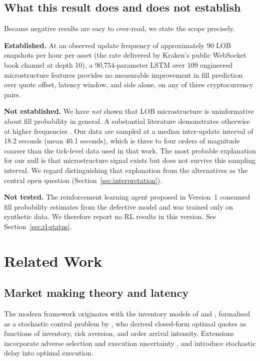 \documentclass[11pt]{article}
\begin{document}
\subsection{What this result does and does not establish}
\label{sec:scope}

Because negative results are easy to over-read, we state the scope precisely.

\textbf{Established.} At an observed update frequency of approximately 90 LOB
snapshots per hour per asset (the rate delivered by Kraken's public WebSocket
book channel at depth 10), a 90{,}754-parameter LSTM over 109
engineered microstructure features provides no measurable improvement in fill
prediction over quote offset, latency window, and side alone, on any of three
cryptocurrency pairs.

\textbf{Not established.} We have \emph{not} shown that LOB microstructure is
uninformative about fill probability in general. A substantial literature
demonstrates otherwise at higher frequencies
\citep{maglaras2022,arroyo2024}. Our data are sampled at a median inter-update
interval of 18.2 seconds (mean 40.1 seconds), which is three to four orders of
magnitude coarser than the tick-level data used in that work. The most probable
explanation for our null is that microstructure signal exists but does not
survive this sampling interval. We regard distinguishing that explanation from
the alternatives as the central open question
(Section~\ref{sec:interpretation}).

\textbf{Not tested.} The reinforcement learning agent proposed in Version~1
consumed fill probability estimates from the defective model and was trained
only on synthetic data. We therefore report no RL results in this version. See
Section~\ref{sec:rl-status}.

\section{Related Work}

\subsection{Market making theory and latency}

The modern framework originates with the inventory models of \citet{garman1976}
and \citet{ho1981}, formalised as a stochastic control problem by
\citet{avellaneda2008}, who derived closed-form optimal quotes as functions of
inventory, risk aversion, and order arrival intensity. Extensions incorporate
adverse selection and execution uncertainty \citep{cartea2018}, and
\citet{cartea2023} introduce stochastic delay into optimal execution.
\end{document}
